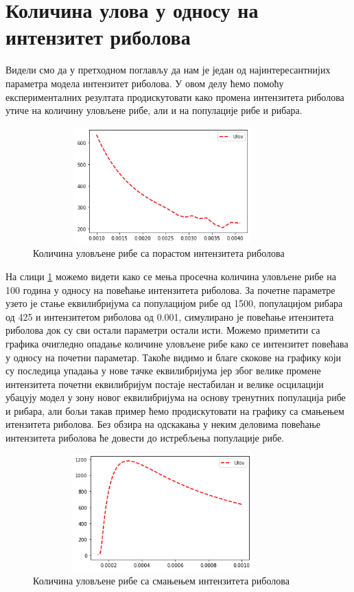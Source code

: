 \documentclass[a4paper]{article}
\begin{document}
{\section{Количина улова у односу на интензитет риболова}
\label{sec:fishingintensity}
 Видели смо да у претходном поглављу да нам је један од најинтересантнијих параметра модела интензитет риболова. У овом делу ћемо помоћу експерименталних резултата продискутовати како промена интензитета риболова утиче на количину уловљене рибе, али и на популације рибе и рибара. 
 
\begin{figure}[h!]
	\centering
	\includegraphics[width=10cm,height=4.5cm]{images/intensityIncrease.png}
	\caption{Количина уловљене рибе са порастом интензитета риболова}
	\label{intensityincrease}
\end{figure}
 
На слици \ref{intensityincrease} можемо видети како се мења просечна количина уловљене рибе на 100 година у односу на повећање интензитета риболова. За почетне параметре узето је стање еквилибријума са популацијом рибе од 1500, популацијом рибара од 425 и интензитетом риболова од 0.001, симулирано је повећање итензитета риболова док су сви остали параметри остали исти. Можемо приметити са графика очигледно опадање количине уловљене рибе како се интензитет повећава у односу на почетни параметар. Такоће видимо и благе скокове на графику који су последица упадања у нове тачке еквилибријума јер због велике промене интензитета почетни еквилибријум постаје нестабилан и велике осцилацији убацују модел у зону новог еквилибријума на основу тренутних популација рибе и рибара, али бољи такав пример ћемо продискутовати на графику са смањењем итензитета риболова. Без обзира на одскакања у неким деловима повећање интензитета риболова ће довести до истребљења популације рибе.

\begin{figure}[h!]
	\centering
	\includegraphics[width=10cm,height=4.5cm]{images/intensityDecrease.png}
	\caption{Количина уловљене рибе са смањењем интензитета риболова}
	\label{intensitydecrease}
\end{figure}

}
\end{document}
